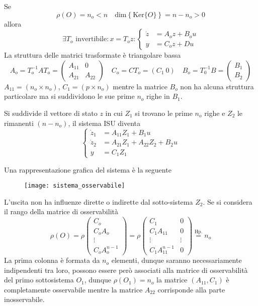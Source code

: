 Se
$$
\rho(O) = n_o < n \quad \text{dim}\left\{
\text{Ker}\{O\}
\right\} = n -n_o > 0
$$
allora
$$
\exists T_o \text{ invertibile}: x=T_oz:
\left\{\begin{aligned}
\dot{z} &= A_oz + B_ou \\
y &= C_oz +Du
\end{aligned}\right.
$$
La struttura delle matrici trasformate è triangolare bassa
$$
A_o = T^{-1}_oAT_o = \begin{pmatrix}
A_{11} & 0 \\
A_{21} & A_{22}
\end{pmatrix} \quad
C_o = CT_o = (C_1\ 0) \quad
B_o = T_0^{-1} B = \begin{pmatrix}
B_1 \\ B_2
\end{pmatrix}
$$
$A_{11} = (n_o\times n_o)$, $C_1 = (p\times n_o)$ mentre la matrice $B_o$ non
ha alcuna struttura particolare ma si suddividono le sue prime $n_o$ righe in
$B_1$.

Si suddivide il vettore di stato $z$ in cui $Z_1$ si trovano le prime
$n_o$ righe e $Z_2$ le rimanenti $(n-n_o)$, il sistema ISU diventa
$$
\left\{\begin{aligned}
\dot{z}_1 & = A_{11} Z_1 + B_1u \\
\dot{z}_2 &= A_{21} Z_1 + A_{22} Z_2 +B_2 u \\
y & = C_1Z_1
\end{aligned}\right.
$$

\newpage
Una rappresentazione grafica del sistema è la seguente
\begin{figure}[h]
\centering
\texttt{[image: sistema\_osservabile]}
\end{figure}
L'uscita non ha influenze dirette o indirette dal sotto-sistema $Z_2$.
Se si considera il rango della matrice di osservabilità
$$
\rho(O) = \rho \begin{pmatrix}
C_o\\C_oA_o \\ \vdots \\ C_oA^{n-1}_o
\end{pmatrix} =\rho
\begin{pmatrix}
C_1 & 0 \\
C_1 A_{11} & 0\\
\vdots & \vdots \\
C_1A_{11}^{n-1} & 0
\end{pmatrix}\stackrel{\text{Hp.}}{=} n_o
$$
La prima colonna è formata da $n_o$ elementi, dunque saranno necessariamente
indipendenti tra loro, possono essere però associati alla matrice di
osservabilità del primo sottosistema $O_1$, dunque $\rho(O_1) = n_o$ la matrice
$(A_{11},C_1)$ è completamente osservabile mentre la matrice $A_{22}$
corrisponde alla parte inosservabile.

